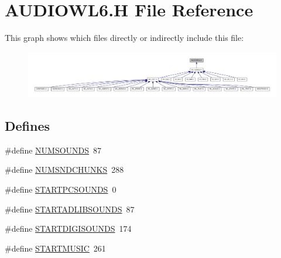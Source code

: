 \hypertarget{AUDIOWL6_8H}{
\section{AUDIOWL6.H File Reference}
\label{AUDIOWL6_8H}
}
This graph shows which files directly or indirectly include this file:
\nopagebreak
\begin{figure}[H]
\begin{center}
\leavevmode
\includegraphics[width=400pt]{AUDIOWL6_8H__dep__incl}
\end{center}
\end{figure}
\subsection*{Defines}
\begin{DoxyCompactItemize}
\item 
\#define \hyperlink{AUDIOWL6_8H_aa948e91a657468d5faa690ec1a89230b}{NUMSOUNDS}~87
\item 
\#define \hyperlink{AUDIOWL6_8H_adb660029e11963733384781d8bd6dc24}{NUMSNDCHUNKS}~288
\item 
\#define \hyperlink{AUDIOWL6_8H_a1c2885b0208a74942feaa303bb5b1119}{STARTPCSOUNDS}~0
\item 
\#define \hyperlink{AUDIOWL6_8H_a7d40bf6bf62cde9ae5f212e063328200}{STARTADLIBSOUNDS}~87
\item 
\#define \hyperlink{AUDIOWL6_8H_adb5a42984ba81d350a944cc41434a6f7}{STARTDIGISOUNDS}~174
\item 
\#define \hyperlink{AUDIOWL6_8H_acdd20a00d56efe82715df1d7a2facc10}{STARTMUSIC}~261
\end{DoxyCompactItemize}
